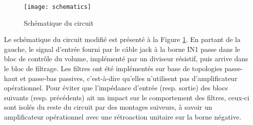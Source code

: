 \begin{figure}[ht!]
	\centering
	\texttt{[image: schematics]}
	\caption{Schématique du circuit}
	\label{fig2:schematics}
\end{figure}

Le schématique du circuit modifié est présenté à la Figure \ref{fig2:schematics}. En partant de la gauche, le signal d'entrée fourni par le câble jack à la borne IN1 passe dans le bloc de contrôle du volume, implémenté par un diviseur résistif, puis arrive dans le bloc de filtrage. Les filtres ont été implémentés sur base de topologies passe-haut et passe-bas passives, c'est-à-dire qu'elles n'utilisent pas d'amplificateur opérationnel. Pour éviter que l'impédance d'entrée (resp. sortie) des blocs suivants (resp. précédents) ait un impact sur le comportement des filtres, ceux-ci sont isolés du reste du circuit par des montages suiveurs, à savoir un amplificateur opérationnel avec une rétroaction unitaire sur la borne négative.